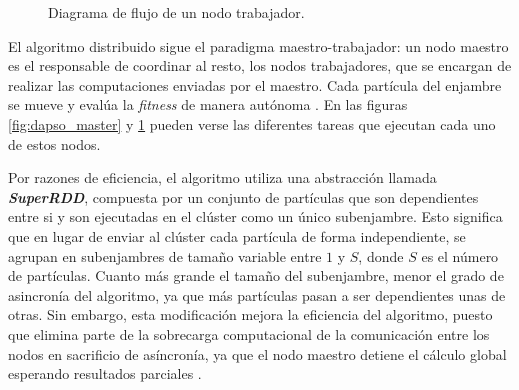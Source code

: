 \begin{figure}[th!]
    \centering
    \caption{Diagrama de flujo de un nodo trabajador.}
    \label{fig:dapso_slave}
\end{figure}

\vspace{10pt}
El algoritmo distribuido sigue el paradigma maestro-trabajador: un nodo maestro es el responsable de coordinar al 
resto, los nodos trabajadores, que se encargan de realizar las computaciones enviadas por el maestro. Cada 
partícula del enjambre se mueve y evalúa la \textit{fitness} de manera autónoma \cite{dapso}. En las figuras 
\ref{fig:dapso_master} y \ref{fig:dapso_slave} pueden verse las diferentes tareas que ejecutan cada uno de estos 
nodos.

\vspace{10pt}
Por razones de eficiencia, el algoritmo utiliza una abstracción llamada \textbf{\textit{SuperRDD}}, compuesta por un
conjunto de partículas que son dependientes entre si y son ejecutadas en el clúster como un único subenjambre. Esto
significa que en lugar de enviar al clúster cada partícula de forma independiente, se agrupan en subenjambres de 
tamaño variable entre $1$ y $S$, donde $S$ es el número de partículas. Cuanto más grande el tamaño del subenjambre,
menor el grado de asincronía del algoritmo, ya que más partículas pasan a ser dependientes unas de otras. Sin 
embargo, esta modificación mejora la eficiencia del algoritmo, puesto que elimina parte de la sobrecarga 
computacional de la comunicación entre los nodos en sacrificio de asíncronía, ya que el nodo maestro detiene el
cálculo global esperando resultados parciales \cite{dapso}.

